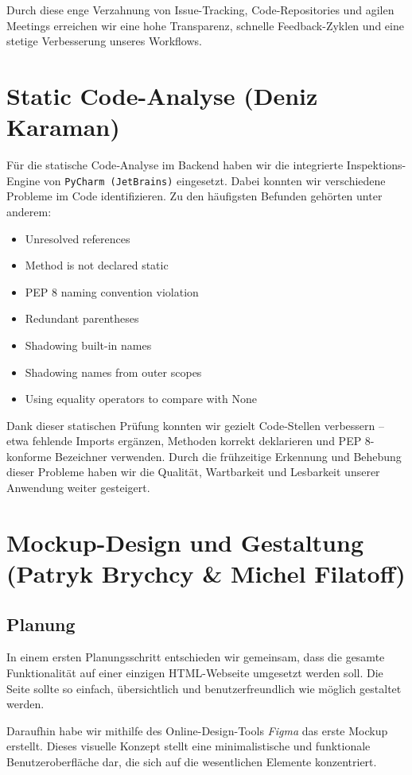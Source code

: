 \documentclass{article}
\begin{document}
Durch diese enge Verzahnung von Issue-Tracking, Code-Repositories und agilen Meetings erreichen wir eine hohe Transparenz, schnelle Feedback-Zyklen und eine stetige Verbesserung unseres Workflows.

\section{Static Code-Analyse (Deniz Karaman)}
Für die statische Code‐Analyse im Backend haben wir die integrierte Inspektions-Engine von \texttt{PyCharm (JetBrains)} eingesetzt. Dabei konnten wir verschiedene Probleme im Code identifizieren. Zu den häufigsten Befunden gehörten unter anderem:

\begin{itemize}
  \item Unresolved references
  \item Method is not declared static
  \item PEP 8 naming convention violation 
  \item Redundant parentheses
  \item Shadowing built-in names
  \item Shadowing names from outer scopes
  \item Using equality operators to compare with None
\end{itemize}

Dank dieser statischen Prüfung konnten wir gezielt Code-Stellen verbessern – etwa fehlende Imports ergänzen, Methoden korrekt deklarieren und PEP 8-konforme Bezeichner verwenden. Durch die frühzeitige Erkennung und Behebung dieser Probleme haben wir die Qualität, Wartbarkeit und Lesbarkeit unserer Anwendung weiter gesteigert.

\section{Mockup-Design und Gestaltung \small{(Patryk Brychcy \& Michel Filatoff)}}
\subsection{Planung}
In einem ersten Planungsschritt entschieden wir gemeinsam, dass die gesamte Funktionalität auf einer einzigen HTML-Webseite umgesetzt werden soll. Die Seite sollte so einfach, übersichtlich und benutzerfreundlich wie möglich gestaltet werden.

Daraufhin habe wir mithilfe des Online-Design-Tools \textit{Figma} das erste Mockup erstellt. Dieses visuelle Konzept stellt eine minimalistische und funktionale Benutzeroberfläche dar, die sich auf die wesentlichen Elemente konzentriert.
\end{document}
